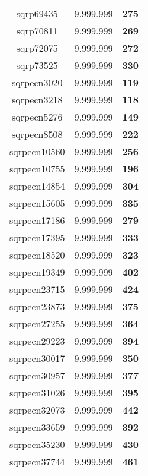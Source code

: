 \begin{tabular}{cc||c}
sqrp69435        & 9.999.999        & {\bf 275}       \\ 
sqrp70811        & 9.999.999        & {\bf 269}       \\ 
sqrp72075        & 9.999.999        & {\bf 272}       \\ 
sqrp73525        & 9.999.999        & {\bf 330}       \\ 
sqrpecn3020      & 9.999.999        & {\bf 119}       \\ 
sqrpecn3218      & 9.999.999        & {\bf 118}       \\ 
sqrpecn5276      & 9.999.999        & {\bf 149}       \\ 
sqrpecn8508      & 9.999.999        & {\bf 222}       \\ 
sqrpecn10560     & 9.999.999        & {\bf 256}       \\ 
sqrpecn10755     & 9.999.999        & {\bf 196}       \\ 
sqrpecn14854     & 9.999.999        & {\bf 304}       \\ 
sqrpecn15605     & 9.999.999        & {\bf 335}       \\ 
sqrpecn17186     & 9.999.999        & {\bf 279}       \\ 
sqrpecn17395     & 9.999.999        & {\bf 333}       \\ 
sqrpecn18520     & 9.999.999        & {\bf 323}       \\ 
sqrpecn19349     & 9.999.999        & {\bf 402}       \\ 
sqrpecn23715     & 9.999.999        & {\bf 424}       \\ 
sqrpecn23873     & 9.999.999        & {\bf 375}       \\ 
sqrpecn27255     & 9.999.999        & {\bf 364}       \\ 
sqrpecn29223     & 9.999.999        & {\bf 394}       \\ 
sqrpecn30017     & 9.999.999        & {\bf 350}       \\ 
sqrpecn30957     & 9.999.999        & {\bf 377}       \\ 
sqrpecn31026     & 9.999.999        & {\bf 395}       \\ 
sqrpecn32073     & 9.999.999        & {\bf 442}       \\ 
sqrpecn33659     & 9.999.999        & {\bf 392}       \\ 
sqrpecn35230     & 9.999.999        & {\bf 430}       \\ 
sqrpecn37744     & 9.999.999        & {\bf 461}       \\ 

\end{tabular}
